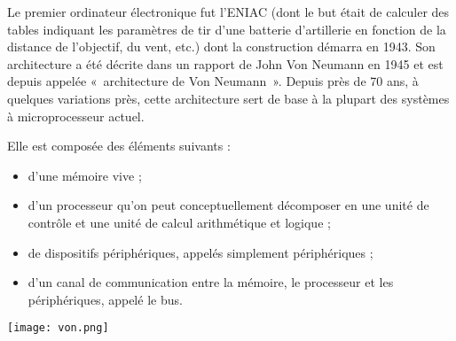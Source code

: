 Le premier ordinateur électronique fut l’ENIAC
(dont le but était de calculer des tables indiquant les paramètres de tir d’une batterie d’artillerie
en fonction de la distance de l’objectif, du vent, etc.) dont la construction démarra
en 1943. 
Son architecture a été décrite dans un rapport de John Von Neumann en 1945 et
est depuis appelée «~architecture de Von Neumann~». Depuis près de 70 ans, à quelques variations
près, cette  architecture sert de base à la plupart des systèmes à microprocesseur actuel. 

\begin{minipage}[c]{.49\linewidth}
Elle est composée des éléments suivants :
\begin{itemize}
\item d'une mémoire vive ;
\item d'un processeur qu'on peut conceptuellement décomposer en une unité de contrôle et
une unité de calcul arithmétique et logique ;
\item de dispositifs périphériques, appelés simplement périphériques ;
\item d'un canal de communication entre la mémoire, le processeur et les périphériques, appelé
le bus.
\end{itemize}
\end{minipage} \hfill
\begin{minipage}[c]{.49\linewidth}
\begin{center}
\texttt{[image: von.png]}
\end{center}
\end{minipage}

